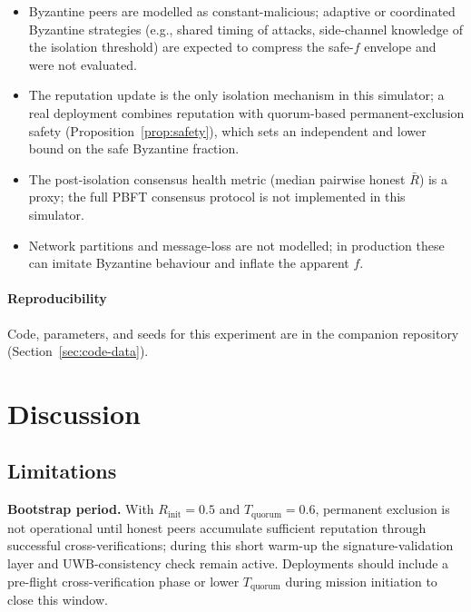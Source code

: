 \documentclass[journal,10pt,twocolumn]{IEEEtran}
\begin{document}
\begin{itemize}
  \item Byzantine peers are modelled as constant-malicious; adaptive
    or coordinated Byzantine strategies (e.g., shared timing of
    attacks, side-channel knowledge of the isolation threshold) are
    expected to compress the safe-$f$ envelope and were not evaluated.
  \item The reputation update is the only isolation mechanism in this
    simulator; a real deployment combines reputation with quorum-based
    permanent-exclusion safety (Proposition~\ref{prop:safety}),
    which sets an independent and lower bound on the safe Byzantine
    fraction.
  \item The post-isolation consensus health metric (median pairwise
    honest $\bar{R}$) is a proxy; the full PBFT consensus protocol
    is not implemented in this simulator.
  \item Network partitions and message-loss are not modelled; in
    production these can imitate Byzantine behaviour and inflate the
    apparent $f$.
\end{itemize}

\paragraph{Reproducibility}
Code, parameters, and seeds for this experiment are in the
companion repository (Section~\ref{sec:code-data}).

\section{Discussion}
\label{sec:discussion}

\subsection{Limitations}

\textbf{Bootstrap period.} With $R_\text{init}{=}0.5$ and $T_\text{quorum}{=}0.6$, permanent exclusion is not operational until honest peers accumulate sufficient reputation through successful cross-verifications; during this short warm-up the signature-validation layer and UWB-consistency check remain active. Deployments should include a pre-flight cross-verification phase or lower $T_\text{quorum}$ during mission initiation to close this window.
\end{document}
